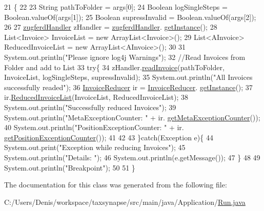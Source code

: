 \begin{DoxyCode}
21                                                               \{
22         
23         String pathToFolder = args[0];
24         Boolean logSingleSteps = Boolean.valueOf(args[1]);
25         Boolean supressInvalid = Boolean.valueOf(args[2]);
26         
27         \hyperlink{class_import_1_1zugferd_handler}{zugferdHandler} zHandler = \hyperlink{class_import_1_1zugferd_handler}{zugferdHandler}.
      \hyperlink{class_import_1_1zugferd_handler_ad3acd84340c8a5fcb2c01a2636979786}{getInstance}();
28         List<Invoice> InvoiceList = \textcolor{keyword}{new} ArrayList<Invoice>();
29         List<AInvoice> ReducedInvoiceList = \textcolor{keyword}{new} ArrayList<AInvoice>();
30         
31         System.out.println(\textcolor{stringliteral}{"Please ignore log4j Warnings"});
32         \textcolor{comment}{//Read Invoices from Folder and add to List}
33         \textcolor{keywordflow}{try}\{
34             zHandler.\hyperlink{class_import_1_1zugferd_handler_aea79c23595f003c943e908c95276ecf9}{readInvoice}(pathToFolder, InvoiceList, logSingleSteps, supressInvalid);
35             System.out.println(\textcolor{stringliteral}{"All Invoices successfully readed"});
36             \hyperlink{class_reduced_invoice_1_1_invoice_reducer}{InvoiceReducer} ir = \hyperlink{class_reduced_invoice_1_1_invoice_reducer}{InvoiceReducer}.
      \hyperlink{class_reduced_invoice_1_1_invoice_reducer_ad4fafc7b331a78ef243c3e3ba88803da}{getInstance}();
37             ir.\hyperlink{class_reduced_invoice_1_1_invoice_reducer_af064188d62db15e810468e4811af6cc5}{ReducedInvoiceList}(InvoiceList, ReducedInvoiceList);
38             System.out.println(\textcolor{stringliteral}{"Successfully reduced Invoices"});
39             System.out.println(\textcolor{stringliteral}{"MetaExceptionCounter: "} + ir.
      \hyperlink{class_reduced_invoice_1_1_invoice_reducer_a987de6f3876284a7b456240f85dc066f}{getMetaExceptionCounter}());
40             System.out.println(\textcolor{stringliteral}{"PositionExceptionCounter: "} + ir.
      \hyperlink{class_reduced_invoice_1_1_invoice_reducer_ad5034d72d8eae0edc2026c9ca9e66465}{getPositionExceptionCounter}());
41             
42             
43         \}\textcolor{keywordflow}{catch}(Exception e)\{
44             System.out.print(\textcolor{stringliteral}{"Exception while reducing Invoices"});
45             System.out.println(\textcolor{stringliteral}{"Details: "});
46             System.out.println(e.getMessage());
47         \}
48         
49         System.out.println(\textcolor{stringliteral}{"Breakpoint"});
50         
51     \}
\end{DoxyCode}


The documentation for this class was generated from the following file\+:\begin{DoxyCompactItemize}
\item 
C\+:/\+Users/\+Denis/workspace/taxsynapse/src/main/java/\+Application/\hyperlink{_run_8java}{Run.\+java}\end{DoxyCompactItemize}
